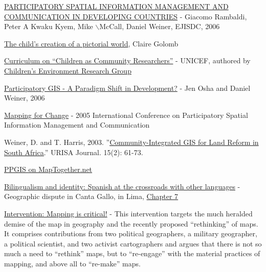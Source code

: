 \documentclass[11pt]{report}
\begin{document}
\href{http://www.ejisdc.org/ojs2/index.php/ejisdc/article/viewFile/237/158}{PARTICIPATORY SPATIAL INFORMATION MANAGEMENT AND COMMUNICATION IN DEVELOPING COUNTRIES} - Giacomo Rambaldi, Peter A Kwaku Kyem, Mike $\backslash$McCall, Daniel Weiner, EJISDC, 2006

\href{http://books.google.com/books?id=4u79ffyzekoC&printsec=frontcover&dq=child%27s+pictorial+world&ei=5EUYS9veGqPqygShs7TVBw#v=onepage&q=&f=false}{The child'{}s creation of a pictorial world}, Claire Golomb

\href{http://www.unicef.org/teachers/researchers/intro.htm}{Curriculum on ``{}Children as Community Researchers''{}} - UNICEF, authored by \href{http://web.gc.cuny.edu/che/cerg/about_cerg/environmental_learning_index.htm}{Children'{}s Environment Research Group}

\href{http://www.directionsmag.com/article.php?article_id=2365&trv=1.}{Participatory GIS - A Paradigm Shift in Development?} - Jen Osha and Daniel Weiner, 2006

\href{http://www.iapad.org/pgis2005/}{Mapping for Change} - 2005 International Conference on Participatory Spatial Information Management and Communication

Weiner, D. and T. Harris, 2003. ''{}\href{http://www.rri.wvu.edu/pdffiles/gisweiner.pdf}{Community-Integrated GIS for Land Reform in South Africa}.''{} URISA Journal. 15(2): 61-73.

\href{http://www.maptogether.net/taxonomy/term/151}{PPGIS on MapTogether.net}

\href{http://books.google.com/books?hl=en&lr=&id=_VK-ABCKlVgC&oi=fnd&pg=PA3&dq=Nino+Bariola&ots=_r1wMwjiou&sig=TH0Gn1P27Xtsdq2Oc0Up5D6HLzg#v=onepage&q=Nino%20Bariola&f=false}{Bilingualism and identity: Spanish at the crossroads with other languages} - Geographic dispute in Canta Gallo, in Lima, \href{http://books.google.com/books?id=_VK-ABCKlVgC&lpg=PA3&ots=_r1wMwjiou&dq=Nino%20Bariola&lr=&pg=PA153#v=onepage&q=&f=true}{Chapter 7}

\href{http://www.sciencedirect.com/science?_ob=ArticleURL&_udi=B6VG2-4XHJX4B-1&_user=10&_coverDate=08/31/2009&_rdoc=1&_fmt=high&_orig=search&_sort=d&_docanchor=&view=c&_searchStrId=1186930669&_rerunOrigin=google&_acct=C000050221&_version=1&_urlVersion=0&_userid=10&md5=a9327ffa62e089e863f892a4551c1717}{Intervention: Mapping is critical!} - This intervention targets the much heralded demise of the map in geography and the recently proposed “rethinking” of maps. It comprises contributions from two political geographers, a military geographer, a political scientist, and two activist cartographers and argues that there is not so much a need to “rethink” maps, but to “re-engage” with the material practices of mapping, and above all to “re-make” maps.
\end{document}
